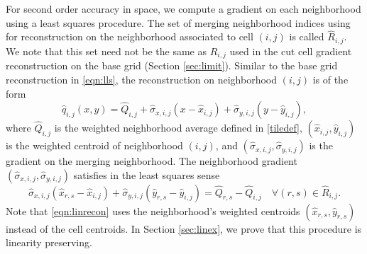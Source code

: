 For second order accuracy in space, we compute a gradient on each neighborhood using a least squares procedure.
The set of merging neighborhood indices using for reconstruction on the neighborhood associated to cell $(i,j)$ is called $\widehat R_{i,j}$.
We note that this set need not be the same as $R_{i,j}$ used in the cut cell gradient reconstruction on the base grid (Section \ref{sec:limit}). 
Similar to the base grid reconstruction in \eqref{eqn:lls}, the reconstruction on neighborhood $(i,j)$ is of the form
\begin{equation}\label{eq:qrecon}
\widehat{q}_{i,j}(x,y) = \widehat{Q}_{i, j} + \widehat{\sigma}_{x,i,j}(x - \widehat{x}_{i,j}) + \widehat{\sigma}_{y,i,j}(y - \widehat{y}_{i,j}),
\end{equation}
where $\widehat{Q}_{i, j}$ is the weighted neighborhood average defined in \eqref{tiledef}, $(\widehat{x}_{i,j},\widehat{y}_{i,j})$ is the weighted centroid of neighborhood $(i,j)$, and $(\widehat{\sigma}_{x,i,j},\widehat{\sigma}_{y,i,j})$ is 
the gradient on the merging neighborhood.
The neighborhood gradient $(\widehat{\sigma}_{x,i,j},\widehat{\sigma}_{y,i,j})$ satisfies in the least squares sense
\begin{equation}\label{eqn:linrecon}
\widehat{\sigma}_{x,i,j}(\widehat{x}_{r,s} - \widehat{x}_{i,j}) +
\widehat{\sigma}_{y,i,j}(\widehat{y}_{r,s} - \widehat{y}_{i,j})=
\widehat{Q}_{r,s} - \widehat{Q}_{i, j} \quad \forall (r,s) \in \widehat{R}_{i,j}.
\end{equation}
Note that \eqref{eqn:linrecon} uses the neighborhood's weighted centroids $(\widehat{x}_{r,s},\widehat{y}_{r,s})$ instead of the cell centroids.  In Section \ref{sec:linex}, we prove that this procedure is linearity preserving.





